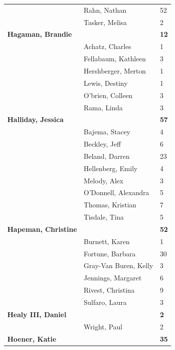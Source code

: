 \documentclass{article}\usepackage[]{graphicx}\usepackage[]{color}
\begin{document}
{\begin{longtable} { >{\raggedright}p{}|p{}p{}}
   \rowcolor[gray]{0.90} & Rahn, Nathan & 52 \\ 
   \rowcolor[gray]{0.90} & Tasker, Melisa & 2 \\ 
  \textbf{Hagaman, Brandie} &  & \hspace{2cm}\textbf{12} \\ 
   & Achatz, Charles & 1 \\ 
   & Fellabaum, Kathleen & 3 \\ 
   \rowcolor[gray]{0.90} & Hershberger, Merton & 1 \\ 
   \rowcolor[gray]{0.90} & Lewis, Destiny & 1 \\ 
   \rowcolor[gray]{0.90} & O'brien, Colleen & 3 \\ 
   & Rama, Linda & 3 \\ 
  \textbf{Halliday, Jessica} &  & \hspace{2cm}\textbf{57} \\ 
   & Bajema, Stacey & 4 \\ 
   \rowcolor[gray]{0.90} & Beckley, Jeff & 6 \\ 
   \rowcolor[gray]{0.90} & Beland, Darren & 23 \\ 
   \rowcolor[gray]{0.90} & Hellenberg, Emily & 4 \\ 
   & Melody, Alex & 3 \\ 
   & O'Donnell, Alexandra & 5 \\ 
   & Thomas, Kristian & 7 \\ 
   \rowcolor[gray]{0.90} & Tisdale, Tina & 5 \\ 
   \rowcolor[gray]{0.90}\textbf{Hapeman, Christine} &  & \hspace{2cm}\textbf{52} \\ 
   \rowcolor[gray]{0.90} & Burnett, Karen & 1 \\ 
   & Fortune, Barbara & 30 \\ 
   & Gray-Van Buren, Kelly & 3 \\ 
   & Jennings, Margaret & 6 \\ 
   \rowcolor[gray]{0.90} & Rivest, Christina & 9 \\ 
   \rowcolor[gray]{0.90} & Sulfaro, Laura & 3 \\ 
   \rowcolor[gray]{0.90}\textbf{Healy III, Daniel} &  & \hspace{2cm}\textbf{2} \\ 
   & Wright, Paul & 2 \\ 
  \textbf{Hoener, Katie} &  & \hspace{2cm}\textbf{35} \\ 

\end{longtable}}
\end{document}
